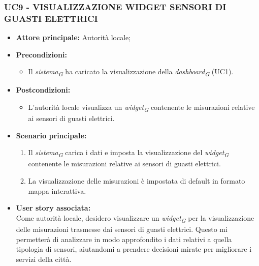 \subsubsection{UC9 - VISUALIZZAZIONE WIDGET SENSORI DI GUASTI ELETTRICI}
\begin{itemize}
    \item \textbf{Attore principale:} Autorità locale;
    \item \textbf{Precondizioni:}
        \begin{itemize}
            \item Il \textit{sistema}\textsubscript{\textit{G}} ha caricato la visualizzazione della \textit{dashboard}\textsubscript{\textit{G}} (UC1).
        \end{itemize}
    \item \textbf{Postcondizioni:}
        \begin{itemize}
            \item L'autorità locale visualizza un \textit{widget}\textsubscript{\textit{G}} contenente le misurazioni relative ai sensori di guasti elettrici.
        \end{itemize}
        \item \textbf{Scenario principale:}
        \begin{enumerate}
            \item Il \textit{sistema}\textsubscript{\textit{G}} carica i dati e imposta la visualizzazione del \textit{widget}\textsubscript{\textit{G}} contenente le misurazioni relative ai sensori di guasti elettrici.
            \item La visualizzazione delle misurazioni è impostata di default in formato mappa interattiva.
        \end{enumerate}
    \item \textbf{User story associata:} \\
        Come autorità locale, desidero visualizzare un \textit{widget}\textsubscript{\textit{G}} per la visualizzazione delle misurazioni trasmesse dai sensori di guasti elettrici. Questo mi permetterà di analizzare in modo approfondito i dati relativi a quella tipologia di sensori, aiutandomi a prendere decisioni mirate per migliorare i servizi della città.
\end{itemize}